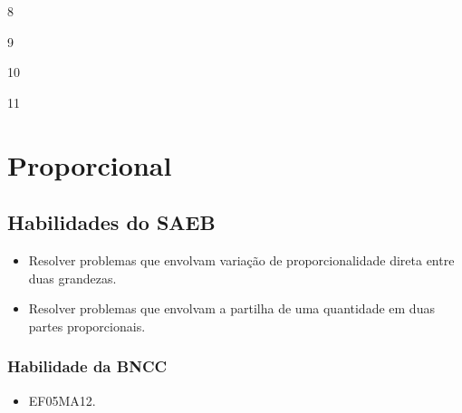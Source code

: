 \begin{escolha}
\item
  8
\item
  9
\item
  10
\item
  11
\end{escolha}


\chapter{Proporcional}

\section*{Habilidades do SAEB}

\begin{itemize}
\item Resolver problemas que envolvam variação de proporcionalidade direta
entre duas grandezas.

\item Resolver problemas que envolvam a partilha de uma quantidade em duas
partes proporcionais.
\end{itemize}

\subsection{Habilidade da BNCC}

\begin{itemize}
\item EF05MA12.
\end{itemize}

